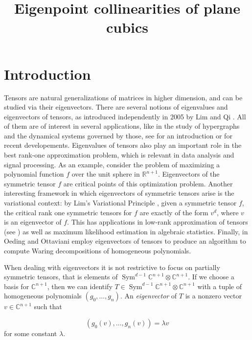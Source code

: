 \documentclass{amsart}
\title{Eigenpoint collinearities of plane cubics}
\author{}
\date{}
\theoremstyle{plain}
\theoremstyle{definition}
\newcommand{\R}{\mathbb{R}}
\newcommand{\C}{\mathbb{C}}
\newcommand{\Sym}{\operatorname{Sym}}
\begin{document}
\maketitle

\section{Introduction}
\label{introduction}

Tensors are natural generalizations of matrices in higher dimension, and can be studied via their eigenvectors. There are several notions of eigenvalues and eigenvectors of tensors, as introduced independently in 2005 by Lim \cite{Lim} and Qi \cite{Qi}. All of them are of interest in several applications, like in the study of hypergraphs and the dynamical systems governed by those, see \cite[Section 4]{QZ} for an introduction or \cite{GMV} for recent developements. Eigenvalues of tensors also play an important role in the best rank-one approximation problem, which is relevant in data analysis and signal processing.
As an example, consider the problem of maximizing a polynomial function $f$ over the unit sphere in $\R^{n+1}$. Eigenvectors of the symmetric tensor $f$ are critical points of this optimization problem. Another interesting framework in which eigenvectors of symmetric tensors arise is the variational context: by Lim's Variational Principle \cite{Lim}, given a symmetric tensor $f$, the critical rank one symmetric tensors for $f$ are exactly of the form $v^d$, where $v$ is an eigenvector of $f$.
This has applications in low-rank approximation of tensors (see \cite{OttSod}) as well as maximum likelihood estimation in algebraic statistics. Finally, in \cite{OO} Oeding and Ottaviani employ eigenvectors of tensors to produce an algorithm to compute Waring decompositions of homogeneous polynomials.

When dealing with eigenvectors it is not restrictive to focus on partially symmetric tensors, that is elements of $\Sym^{d-1}\C^{n+1}\otimes\C^{n+1}$.
 If we choose a basis for $\C^{n+1}$, then we can identify $T\in \Sym^{d-1}\C^{n+1}\otimes\C^{n+1}$ with a tuple of homogeneous polynomials $(g_0,\dots,g_n)$. An \emph{eigenvector} of $T$ is a nonzero vector $v\in\C^{n+1}$ such that

\begin{equation}\label{eq: definizione di autovettore}
(g_0(v), \ldots, g_n(v))=\lambda v
\end{equation}
for some constant $\lambda$.
\end{document}
